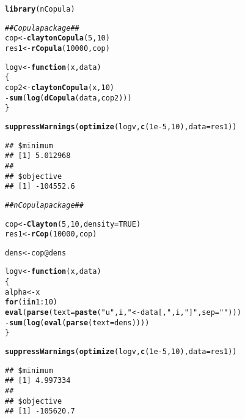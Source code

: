 \documentclass[11pt, english]{article}\usepackage[]{graphicx}\usepackage[]{color}
\makeatletter
\newcommand{\hlnum}[1]{\textcolor[rgb]{0.686,0.059,0.569}{#1}}%
\newcommand{\hlstr}[1]{\textcolor[rgb]{0.192,0.494,0.8}{#1}}%
\newcommand{\hlcom}[1]{\textcolor[rgb]{0.678,0.584,0.686}{\textit{#1}}}%
\newcommand{\hlopt}[1]{\textcolor[rgb]{0,0,0}{#1}}%
\newcommand{\hlstd}[1]{\textcolor[rgb]{0.345,0.345,0.345}{#1}}%
\newcommand{\hlkwa}[1]{\textcolor[rgb]{0.161,0.373,0.58}{\textbf{#1}}}%
\newcommand{\hlkwb}[1]{\textcolor[rgb]{0.69,0.353,0.396}{#1}}%
\newcommand{\hlkwc}[1]{\textcolor[rgb]{0.333,0.667,0.333}{#1}}%
\newcommand{\hlkwd}[1]{\textcolor[rgb]{0.737,0.353,0.396}{\textbf{#1}}}%
\newenvironment{kframe}{%
 \def\at@end@of@kframe{}%
 \ifinner\ifhmode%
  \def\at@end@of@kframe{\end{minipage}}%
  \begin{minipage}{\columnwidth}%
 \fi\fi%
 \def\FrameCommand##1{\hskip\@totalleftmargin \hskip-\fboxsep
 \colorbox{shadecolor}{##1}\hskip-\fboxsep
     \hskip-\linewidth \hskip-\@totalleftmargin \hskip\columnwidth}%
 \MakeFramed {\advance\hsize-\width
   \@totalleftmargin\z@ \linewidth\hsize
   \@setminipage}}%
 {\par\unskip\endMakeFramed%
 \at@end@of@kframe}
\newenvironment{knitrout}{}{} %
\makeatother
\begin{document}
\begin{knitrout}\small
{}\color{fgcolor}\begin{kframe}
\begin{alltt}
\hlkwd{library}\hlstd{(nCopula)}
\end{alltt}


{\ttfamily\noindent\itshape\color{messagecolor}{\#\# Loading required package: copula}}

{\ttfamily\noindent\color{warningcolor}{\#\# Warning: package 'copula' was built under R version 3.3.2}}\begin{alltt}
\hlcom{## Copula package ##}
\hlstd{cop} \hlkwb{<-} \hlkwd{claytonCopula}\hlstd{(}\hlnum{5}\hlstd{,} \hlnum{10}\hlstd{)}
\hlstd{res1} \hlkwb{<-} \hlkwd{rCopula}\hlstd{(}\hlnum{10000}\hlstd{, cop)}

\hlstd{logv} \hlkwb{<-} \hlkwa{function}\hlstd{(}\hlkwc{x}\hlstd{,} \hlkwc{data}\hlstd{)}
\hlstd{\{}
  \hlstd{cop2} \hlkwb{<-} \hlkwd{claytonCopula}\hlstd{(x,} \hlnum{10}\hlstd{)}
  \hlopt{-}\hlkwd{sum}\hlstd{(}\hlkwd{log}\hlstd{(}\hlkwd{dCopula}\hlstd{(data, cop2)))}
\hlstd{\}}

\hlkwd{suppressWarnings}\hlstd{(}\hlkwd{optimize}\hlstd{(logv,} \hlkwd{c}\hlstd{(}\hlnum{1e-5}\hlstd{,} \hlnum{10}\hlstd{),} \hlkwc{data} \hlstd{= res1))}
\end{alltt}
\begin{verbatim}
## $minimum
## [1] 5.012968
## 
## $objective
## [1] -104552.6
\end{verbatim}
\begin{alltt}
\hlcom{## nCopula package ##}

\hlstd{cop} \hlkwb{<-} \hlkwd{Clayton}\hlstd{(}\hlnum{5}\hlstd{,} \hlnum{10}\hlstd{,} \hlkwc{density} \hlstd{=} \hlnum{TRUE}\hlstd{)}
\hlstd{res1} \hlkwb{<-} \hlkwd{rCop}\hlstd{(}\hlnum{10000}\hlstd{, cop)}

\hlstd{dens} \hlkwb{<-} \hlstd{cop}\hlopt{@}\hlkwc{dens}

\hlstd{logv} \hlkwb{<-} \hlkwa{function}\hlstd{(}\hlkwc{x}\hlstd{,} \hlkwc{data}\hlstd{)}
\hlstd{\{}
  \hlstd{alpha} \hlkwb{<-} \hlstd{x}
  \hlkwa{for} \hlstd{(i} \hlkwa{in} \hlnum{1}\hlopt{:}\hlnum{10}\hlstd{)}
    \hlkwd{eval}\hlstd{(}\hlkwd{parse}\hlstd{(}\hlkwc{text} \hlstd{=} \hlkwd{paste}\hlstd{(}\hlstr{"u"}\hlstd{, i,} \hlstr{" <- data[,"}\hlstd{, i,} \hlstr{"]"}\hlstd{,} \hlkwc{sep} \hlstd{=} \hlstr{""}\hlstd{)))}
  \hlopt{-}\hlkwd{sum}\hlstd{(}\hlkwd{log}\hlstd{(}\hlkwd{eval}\hlstd{(}\hlkwd{parse}\hlstd{(}\hlkwc{text} \hlstd{= dens))))}
\hlstd{\}}

\hlkwd{suppressWarnings}\hlstd{(}\hlkwd{optimize}\hlstd{(logv,} \hlkwd{c}\hlstd{(}\hlnum{1e-5}\hlstd{,} \hlnum{10}\hlstd{),} \hlkwc{data} \hlstd{= res1))}
\end{alltt}
\begin{verbatim}
## $minimum
## [1] 4.997334
## 
## $objective
## [1] -105620.7
\end{verbatim}
\end{kframe}
\end{knitrout}
\end{document}
